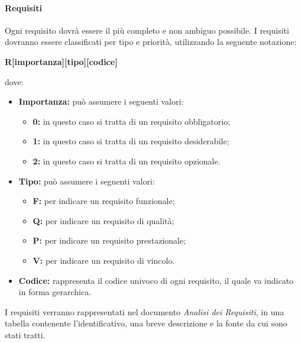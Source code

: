 \paragraph{Requisiti\\}
\label{requisiti}
Ogni requisito dovrà essere il più completo e non ambiguo possibile. I requisiti dovranno essere classificati per tipo e priorità, utilizzando la seguente notazione:
\begin{center}
\textbf{R[importanza][tipo][codice]}
\end{center}
dove:
\begin{itemize}
\item\textbf{Importanza:} può assumere i seguenti valori:
\begin{itemize}
\item\textbf{0:} in questo caso si tratta di un requisito obbligatorio;
\item\textbf{1:} in questo caso si tratta di un requisito desiderabile;
\item\textbf{2:} in questo caso si tratta di un requisito opzionale.
\end{itemize}
\item\textbf{Tipo:} può assumere i seguenti valori:
\begin{itemize}
\item\textbf{F:} per indicare un requisito funzionale;
\item\textbf{Q:} per indicare un requisito di qualità;
\item\textbf{P:} per indicare un requisito prestazionale;
\item\textbf{V:} per indicare un requisito di vincolo.
\end{itemize}
\item\textbf{Codice:} rappresenta il codice univoco di ogni requisito, il quale va indicato in forma gerarchica.
\end{itemize}
I requisiti verranno rappresentati nel documento \emph{Analisi dei Requisiti}, in una tabella contenente l'identificativo, una breve descrizione e la fonte da cui sono stati tratti.

